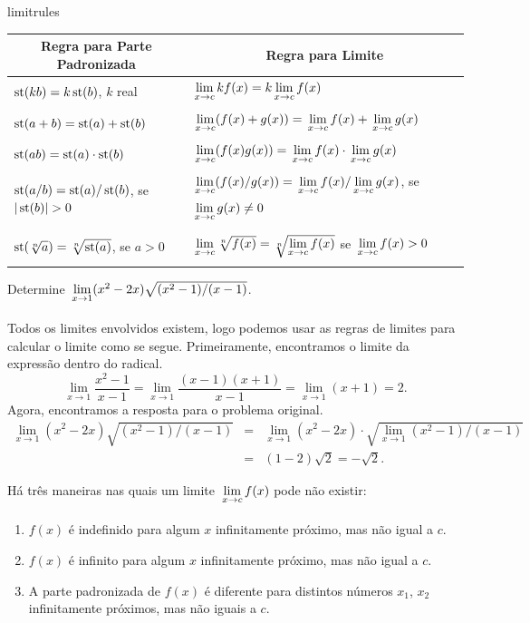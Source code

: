 \begin{includetable}{limitrules}
\setlength{\tabcolsep}{0.7em}
  \begin{tabular}{l|l}
  \hline
    \multicolumn{1}{c|}{Regra para Parte Padronizada} &
      \multicolumn{1}{c}{Regra para Limite} \\
  \hline
    $\operatorname{st}(kb) = k \operatorname{st}(b)$, $k$ real &
    $\dslim{x \to c} k f(x) = k \dslim{x \to c} f(x)$ \\
    $\operatorname{st}(a + b) = \operatorname{st}(a) + \operatorname{st}(b)$ &
    $\dslim{x \to c} (f(x) + g(x)) = \dslim{x \to c} f(x) +
      \dslim{x \to c} g(x)$ \\
    $\operatorname{st}(a b) = \operatorname{st}(a) \cdot \operatorname{st}(b)$ &
    $\dslim{x \to c} (f(x) g(x)) = \dslim{x \to c} f(x) \cdot
      \dslim{x \to c} g(x)$ \\
    $\operatorname{st}(a/b) = \operatorname{st}(a) / \operatorname{st}(b)$, se $|\operatorname{st}(b)| > 0$ &
    $\dslim{x \to c} (f(x) / g(x)) = \dslim{x \to c} f(x) /
      \dslim{x \to c} g(x)$, se $\dslim{x \to c} g(x) \ne 0$  \\
    $\operatorname{st}(\sqrt[n]{a}) = \sqrt[n]{\operatorname{st}(a)}$, se $a > 0$ &
    $\dslim{x \to c} \sqrt[n]{f(x)} = \vclear{\sqrt[n]{\lim\limits_{x \to c} f(x)}}$
      se $\dslim{x \to c} f(x) > 0$ \\
  \hline
  \end{tabular}
\end{includetable}

\begin{example}
  Determine $\dslim{x \to 1} (x^2 - 2x)\sqrt{(x^2-1)/(x-1)}$.

  Todos os limites envolvidos existem, logo podemos usar as regras de limites
  para calcular o limite como se segue. Primeiramente, encontramos o limite
  da expressão dentro do radical.
  $$
    \lim_{x \to 1} \frac{x^2 - 1}{x - 1} =
      \lim_{x \to 1} \frac{(x-1)(x+1)}{x-1} = \lim_{x \to 1} (x+1) = 2.
  $$
  Agora, encontramos a resposta para o problema original.
  \begin{eqnarray*}
    \lim_{x \to 1} (x^2 - 2x)\sqrt{(x^2-1)/(x-1)} & = &
      \lim_{x \to 1} (x^2 - 2x) \cdot \sqrt{\lim_{x \to 1} (x^2-1)/(x-1)} \\
    & = & (1 -2) \sqrt{2} = -\sqrt{2}.
  \end{eqnarray*}
\end{example}

Há três maneiras nas quais um limite $\dslim{x \to c} f(x)$ pode não
existir:
\begin{enumerate}[(1)]
\item $f(x)$ é indefinido para algum $x$ infinitamente próximo, mas não igual
      a $c$.
\item $f(x)$ é infinito para algum $x$ infinitamente próximo, mas não igual a
      $c$.
\item A parte padronizada de $f(x)$ é diferente para distintos números $x_1$,
      $x_2$ infinitamente próximos, mas não iguais a $c$.
\end{enumerate}

